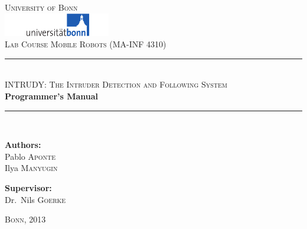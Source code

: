 \begin{titlepage}
\begin{center}

\newcommand{\HRule}{\rule{\linewidth}{0.5mm}}


\textsc{\LARGE University of Bonn}\\[0.5cm]
\includegraphics[width=0.35\textwidth]{img/unilogo.pdf}
\\[1.5cm]
\textsc{Lab Course Mobile Robots (MA-INF 4310)}
\\[1.5cm]
\HRule \\[0.8cm]
\textsc{\Large INTRUDY: The Intruder Detection and Following System}\\[0.5cm]
{ \huge \bfseries Programmer's Manual \\[0.4cm] }

\HRule \\[1.5cm]


\begin{minipage}{0.4\textwidth}
\begin{flushleft} \large
\textbf{Authors:}\\
Pablo \textsc{Aponte} \\
Ilya \textsc{Manyugin} 
\end{flushleft}
\end{minipage}
\begin{minipage}{0.4\textwidth}
\begin{flushright} \large
\textbf{Supervisor:} \\
Dr.~Nils \textsc{Goerke}
\end{flushright}
\end{minipage}

\null
\vfill

\textsc{Bonn, 2013}
\end{center}
\end{titlepage}